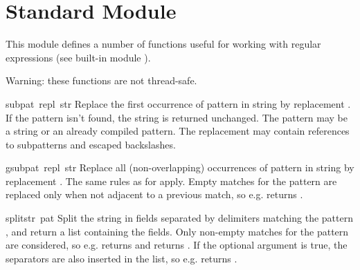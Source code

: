\section{Standard Module }

This module defines a number of functions useful for working with
regular expressions (see built-in module ).

Warning: these functions are not thread-safe.

\renewcommand{\indexsubitem}{(in module regsub)}
\begin{funcdesc}{sub}{pat\, repl\, str}
Replace the first occurrence of pattern  in string
 by replacement .  If the pattern isn't found,
the string is returned unchanged.  The pattern may be a string or an
already compiled pattern.  The replacement may contain references
 to subpatterns and escaped backslashes.
\end{funcdesc}

\begin{funcdesc}{gsub}{pat\, repl\, str}
Replace all (non-overlapping) occurrences of pattern  in
string  by replacement .  The same rules as for
 apply.  Empty matches for the pattern are replaced only
when not adjacent to a previous match, so e.g.
 returns .
\end{funcdesc}

\begin{funcdesc}{split}{str\, pat}
Split the string  in fields separated by delimiters matching
the pattern , and return a list containing the fields.  Only
non-empty matches for the pattern are considered, so e.g.
 returns \code{['a', 'b']} and
 returns \code{['abc']}.
If the optional  argument is true, the separators are also
inserted in the list, so e.g.  returns
\code{['a', ':::', 'b']}.
\end{funcdesc}
